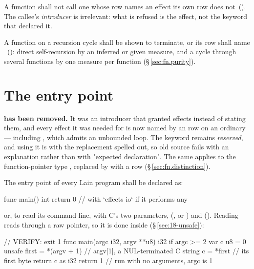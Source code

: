 \begin{constraint}
  A function shall not call one whose row names an effect its own row does
  not~().  The callee's \emph{introducer} is irrelevant: what is
  refused is the effect, not the keyword that declared it.
\end{constraint}

\begin{constraint}
  A function on a recursion cycle shall be shown to terminate, or its row shall name
  ~(): direct self-recursion by an inferred or given measure,
  and a cycle through several functions by one measure per function
  (\S\,\ref{sec:fn.purity}).
\end{constraint}

\section{The entry point}
\label{sec:decl.proc}

\pnum
\textbf{ has been removed.}  It was an introducer that granted effects
instead of stating them, and every effect it was needed for is now named by an
 row on an ordinary  --- including , which
admits an unbounded loop.  The keyword remains \emph{reserved}, and using it is
 with the replacement spelled out, so old source fails with an
explanation rather than with "expected declaration".  The same applies to the
function-pointer type , replaced by  with a row
(\S\,\ref{sec:fn.distinction}).

\pnum
The entry point of every Lain program shall be declared as:

\begin{laincode}
func main() int { return 0 }     // with `effects io` if it performs any
\end{laincode}

\noindent or, to read its command line, with C's two parameters,  (, or
) and  ().  Reading  reads through a raw pointer, so
it is done inside  (\S\,\ref{sec:18-unsafe}):

\begin{laincode}
// VERIFY: exit 1
func main(argc i32, argv **u8) i32 {
    if argc >= 2 {
        var c u8 = 0
        unsafe {
            first = *(argv + 1)       // argv[1], a NUL-terminated C string
            c = *first                // its first byte
        }
        return c as i32
    }
    return 1                          // run with no arguments, argc is 1
}
\end{laincode}


